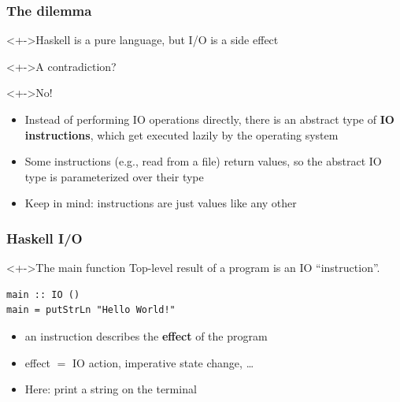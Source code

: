 \documentclass{beamer}
\begin{document}
\begin{frame}[fragile]
  \frametitle{The dilemma}
  \begin{block}<+->{Haskell is a pure language, but I/O is a side effect}
  \end{block}
  \begin{block}<+->{A contradiction?}
  \end{block}
  \begin{block}<+->{No!}
    \begin{itemize}
    \item Instead of performing IO operations directly, there is an
      abstract type of \textbf{IO instructions}, which get executed
      lazily by the operating system
    \item Some instructions (e.g., read from a file) return values, so the abstract IO type is parameterized over their type
    \item Keep in mind: instructions are just values like any other
  \end{itemize}
  \end{block}
\end{frame}
\begin{frame}[fragile]
  \frametitle{Haskell I/O}

\begin{block}<+->{The main function}
  Top-level result of a program is an IO ``instruction''.
\begin{lstlisting}
main :: IO ()
main = putStrLn "Hello World!"
\end{lstlisting}
  \begin{itemize}
  \item an instruction describes the \textbf{effect} of the program
  \item effect $=$ IO action, imperative state change, \dots
  \item Here: print a string on the terminal
  \end{itemize}
\end{block}
\end{frame}
\end{document}
